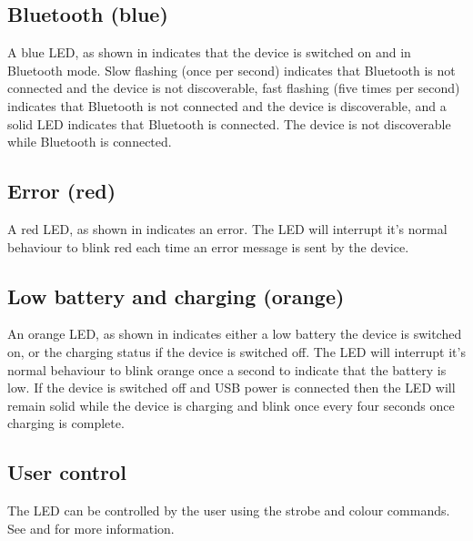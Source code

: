 
\subsection{Bluetooth (blue)}

A blue \ac{LED}, as shown in  indicates that the device is switched on and in Bluetooth mode.  Slow flashing (once per second) indicates that Bluetooth is not connected and the device is not discoverable, fast flashing (five times per second) indicates that Bluetooth is not connected and the device is discoverable, and a solid \ac{LED} indicates that Bluetooth is connected.  The device is not discoverable while Bluetooth is connected.


\subsection{Error (red)}

A red \ac{LED}, as shown in  indicates an error.  The \ac{LED} will interrupt it's normal behaviour to blink red each time an error message is sent by the device.


\subsection{Low battery and charging (orange)}

An orange \ac{LED}, as shown in  indicates either a low battery the device is switched on, or the charging status if the device is switched off.  The \ac{LED} will interrupt it's normal behaviour to blink orange once a second to indicate that the battery is low.  If the device is switched off and USB power is connected then the \ac{LED} will remain solid while the device is charging and blink once every four seconds once charging is complete.


\subsection{User control}

The \ac{LED} can be controlled by the user using the strobe and colour commands.  See  and  for more information.
